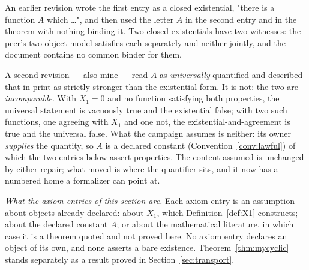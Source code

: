 \begin{remark}
\label{rem:lawfulbinder}
An earlier revision wrote the first entry as a closed existential, "there is a
function $A$ which \ldots", and then used the letter $A$ in the second entry and
in the theorem with nothing binding it. Two closed existentials have two
witnesses: the peer's two-object model satisfies each separately and neither
jointly, and the document contains no common binder for them.

A second revision --- also mine --- read $A$ as \emph{universally} quantified
and described that in print as strictly stronger than the existential form. It
is not: the two are \emph{incomparable}. With $X_1=0$ and no function satisfying
both properties, the universal statement is vacuously true and the existential
false; with two such functions, one agreeing with $X_1$ and one not, the
existential-and-agreement is true and the universal false. What the campaign
assumes is neither: its owner \emph{supplies} the quantity, so $A$ is a declared
constant (Convention~\ref{conv:lawful}) of which the two entries below assert
properties. The content assumed is unchanged by either repair; what moved is
where the quantifier sits, and it now has a numbered home a formalizer can point
at.

\emph{What the axiom entries of this section are.} Each axiom entry is an
assumption about objects already declared: about $X_1$, which
Definition~\ref{def:X1} constructs; about the declared constant $A$; or about
the mathematical literature, in which case it is a theorem quoted and not
proved here. No axiom entry declares an object of its own, and none asserts a
bare existence.
Theorem~\ref{thm:mycyclic} stands separately as a result proved in Section~\ref{sec:transport}.
\end{remark}

